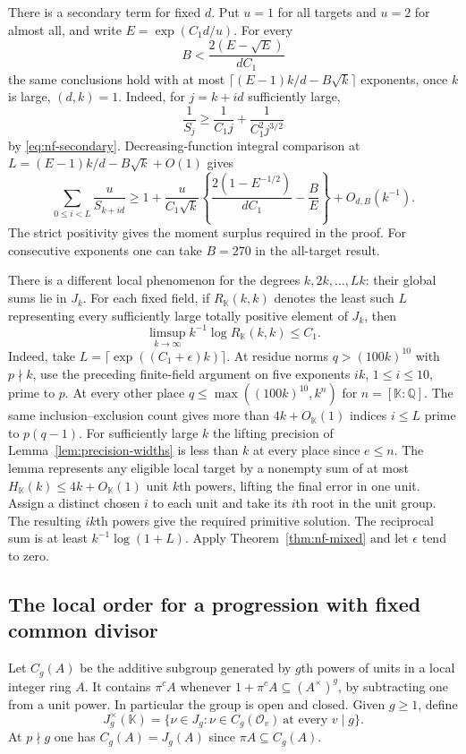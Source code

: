 \documentclass[11pt,letterpaper]{article}
\theoremstyle{definition}
\newcommand{\Q}{\mathbb Q}
\numberwithin{equation}{section}
\begin{document}
There is a secondary term for fixed $d$. Put $u=1$ for all targets
and $u=2$ for almost all, and write $E=\exp(C_1d/u)$. For every
\[
                  B<\frac{2(E-\sqrt E)}{dC_1}
\]
the same conclusions hold with at most
$\lceil(E-1)k/d-B\sqrt k\rceil$ exponents, once $k$ is large,
$(d,k)=1$. Indeed, for $j=k+id$ sufficiently large,
\[
 \frac1{S_j}\ge\frac1{C_1 j}+\frac1{C_1^2 j^{3/2}}
\]
by \eqref{eq:nf-secondary}. Decreasing-function integral comparison
at $L=(E-1)k/d-B\sqrt k+O(1)$ gives
\[
 \sum_{0\le i<L}\frac{u}{S_{k+id}}\ge
 1+\frac{u}{C_1\sqrt k}
 \left\{\frac{2(1-E^{-1/2})}{dC_1}-\frac B E\right\}
 + O_{d,B}(k^{-1}).
\]
The strict positivity gives the moment surplus required in the proof.
For consecutive exponents one can take $B=270$ in the all-target result.

There is a different local phenomenon for the degrees
$k,2k,\ldots,Lk$: their global sums lie in $J_k$. For each fixed
field, if $R_{\mathbb K}(k,k)$ denotes the least such $L$ representing
every sufficiently large totally positive element of $J_k$, then
\begin{equation}\label{eq:nf-mixed-multiples}
 \limsup_{k\to\infty} k^{-1}\log R_{\mathbb K}(k,k)\le C_1.
\end{equation}
Indeed, take $L=\lceil\exp((C_1+\epsilon)k)\rceil$. At residue
norms $q>(100k)^{10}$ with $p\nmid k$, use the preceding
finite-field argument on five exponents $ik$, $1\le i\le10$,
prime to $p$. At every other place $q\le\max((100k)^{10},k^n)$
for $n=[\mathbb K:\Q]$. The same inclusion--exclusion count gives
more than $4k+O_{\mathbb K}(1)$ indices $i\le L$ prime to $p(q-1)$.
For sufficiently large $k$ the lifting precision of
Lemma~\ref{lem:precision-widths} is less than $k$ at every place
since $e\le n$. The lemma represents any eligible local target by a
nonempty sum of at most $H_{\mathbb K}(k)\le4k+O_{\mathbb K}(1)$ unit
$k$th powers, lifting the final error in one unit. Assign a distinct
chosen $i$ to each unit and take its $i$th root in the unit group.
The resulting $ik$th powers give the required primitive solution.
The reciprocal sum is at least $k^{-1}\log(1+L)$. Apply
Theorem~\ref{thm:nf-mixed} and let $\epsilon$ tend to zero.

\subsection{The local order for a progression with fixed common divisor}
\label{sec:nf-mixed-unit-order}
Let $C_g(A)$ be the additive subgroup generated by $g$th powers of
units in a local integer ring $A$. It contains $\pi^c A$ whenever
$1+\pi^c A\subseteq(A^\times)^g$, by subtracting one from a unit
power. In particular the group is open and closed. Given
$g\ge1$, define
\[
 J_g^\times(\mathbb K)=\{\nu\in J_g:
          \nu\in C_g(\mathcal O_v)\ \text{at every }v\mid g\}.
\]
At $p\nmid g$ one has $C_g(A)=J_g(A)$ since $\pi A\subseteq C_g(A)$.
\end{document}

